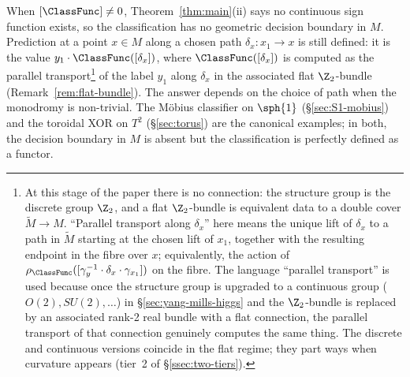 \begin{remark}\label{rem:emergent-boundary}
When $[\ClassFunc]\neq 0$, Theorem~\ref{thm:main}(ii) says no
continuous sign function exists, so the classification has no
geometric decision boundary in $M$. Prediction at a point $x\in M$
along a chosen path $\delta_x\colon x_1\to x$ is still defined:
it is the value $y_1\cdot\ClassFunc([\delta_x])$, where
$\ClassFunc([\delta_x])$ is computed as the parallel
transport\footnote{At this stage of the paper there is no
connection: the structure group is the discrete group $\Z_2$, and a
flat $\Z_2$-bundle is equivalent data to a double cover
$\widetilde{M}\to M$. ``Parallel transport along $\delta_x$'' here
means the unique lift of $\delta_x$ to a path in $\widetilde{M}$
starting at the chosen lift of $x_1$, together with the resulting
endpoint in the fibre over $x$; equivalently, the action of
$\rho_{\ClassFunc}([\gamma_y^{-1}\cdot\delta_x\cdot\gamma_{x_1}])$
on the fibre. The language ``parallel transport'' is used because
once the structure group is upgraded to a continuous group
($O(2),SU(2),\ldots$) in \S\ref{sec:yang-mills-higgs} and the
$\Z_2$-bundle is replaced by an associated rank-2 real bundle with
a flat connection, the parallel transport of that connection
genuinely computes the same thing. The discrete and continuous
versions coincide in the flat regime; they part ways when curvature
appears (tier~2 of \S\ref{ssec:two-tiers}).} of the label $y_1$
along $\delta_x$ in the associated flat $\Z_2$-bundle
(Remark~\ref{rem:flat-bundle}). The answer depends on the choice of
path when the monodromy is non-trivial. The M\"obius classifier on
$\sph{1}$ (\S\ref{sec:S1-mobius}) and the toroidal XOR on $T^2$
(\S\ref{sec:torus}) are the canonical examples; in both, the
decision boundary in $M$ is absent but the classification is
perfectly defined as a functor.
\end{remark}

